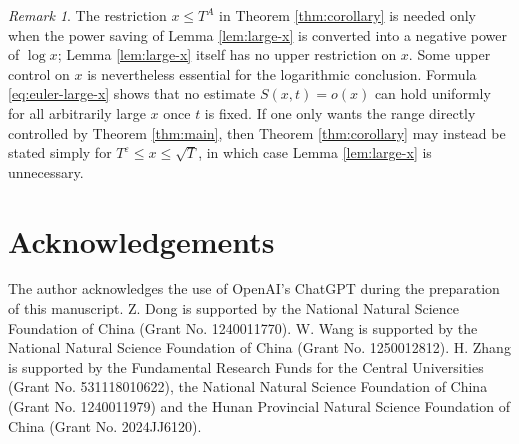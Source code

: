 \documentclass[12pt,reqno]{amsart}
\theoremstyle{remark}
\newtheorem{remark}[theorem]{Remark}
\numberwithin{equation}{section}
\begin{document}
\begin{remark}
The restriction $x\le T^A$ in Theorem \ref{thm:corollary} is needed only when the power saving of Lemma \ref{lem:large-x} is converted into a negative power of $\log x$; Lemma \ref{lem:large-x} itself has no upper restriction on $x$.  Some upper control on $x$ is nevertheless essential for the logarithmic conclusion.  Formula \eqref{eq:euler-large-x} shows that no estimate $S(x,t)=o(x)$ can hold uniformly for all arbitrarily large $x$ once $t$ is fixed.  If one only wants the range directly controlled by Theorem \ref{thm:main}, then Theorem \ref{thm:corollary} may instead be stated simply for $T^\varepsilon\le x\le\sqrt T$, in which case Lemma \ref{lem:large-x} is unnecessary.
\end{remark}

\section*{Acknowledgements}
The author acknowledges the use of OpenAI’s ChatGPT during the preparation of this
manuscript. Z. Dong is supported by  the National
	Natural Science Foundation of China (Grant No. 	1240011770). W. Wang is supported by the National
	Natural Science Foundation of China (Grant No. 1250012812). H. Zhang is supported by the Fundamental Research Funds for the Central Universities (Grant No. 531118010622), the National
	Natural Science Foundation of China (Grant No. 1240011979) and the Hunan Provincial Natural Science Foundation of China (Grant No. 2024JJ6120).
\end{document}
